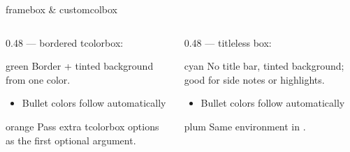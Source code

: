 \documentclass[presentation, aspectratio=169]{beamer}
\begin{document}
\begin{frame}{framebox \& customcolbox}
  \begin{columns}
    \begin{column}{0.48\columnwidth}
      \textbf{} --- bordered tcolorbox:
      \vspace{0.3em}
      \begin{framebox}{green}
        Border + tinted background from one color.
        \begin{itemize}
          \item Bullet colors follow automatically
        \end{itemize}
      \end{framebox}
      \vspace{0.3em}
      \begin{framebox}[title=With extra tcolorbox options]{orange}
        Pass extra tcolorbox options as the first optional argument.
      \end{framebox}
    \end{column}
    \begin{column}{0.48\columnwidth}
      \textbf{} --- titleless box:
      \vspace{0.3em}
      \begin{customcolbox}{cyan}
        No title bar, tinted background; good for side notes or highlights.
        \begin{itemize}
          \item Bullet colors follow automatically
        \end{itemize}
      \end{customcolbox}
      \vspace{0.3em}
      \begin{customcolbox}{plum}
        Same environment in .
      \end{customcolbox}
    \end{column}
  \end{columns}
\end{frame}
\end{document}

